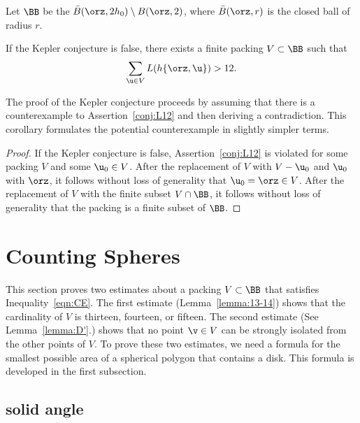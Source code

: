 \begin{definition}[$\BB$] 
Let $\BB$ be the
 $\bar B(\orz,2h_0)\setminus B(\orz,2)$, where
$\bar B(\orz,r)$ is the closed ball of radius $r$.
\end{definition}


\begin{corollary}\label{cor:CE} 
  If the Kepler conjecture is false, there exists a finite packing
  $V\subset\BB$ such that
\begin{equation}\label{eqn:CE} 
\sum_{ \u\in V} L(h\{\orz, \u\}) > 12.
\end{equation}
\end{corollary}

The proof of the Kepler conjecture proceeds by assuming that there is
a counterexample to Assertion~\ref{conj:L12} and then deriving a contradiction.
This corollary formulates the potential counterexample in slightly simpler terms.

\begin{proof} If the Kepler conjecture is false,
Assertion~\ref{conj:L12} is violated for some packing $ V$ and some
$ \u_0\in V$.  After the replacement of $ V$ with $ V - \u_0$ and $
\u_0$ with $\orz$, it follows without loss of generality that $
\u_0=\orz\in V$.  After the replacement of $ V$ with the finite
subset
$V\cap \BB$,
it follows without loss of generality that the packing is a finite subset of $\BB$.
\end{proof}



\section{Counting Spheres}

This section proves two estimates about a packing $V\subset \BB$ that
satisfies Inequality~\ref{eqn:CE}.  The first estimate
(Lemma~\ref{lemma:13-14}) shows that the cardinality of $V$ is thirteen,
fourteen, or fifteen.  The second estimate (See Lemma~\ref{lemma:D'}.)  shows
that no point $\v\in V$ can be strongly isolated from the other points
of $V$.    To prove these two estimates, we need a formula for the smallest
possible area of a spherical polygon that contains a disk.  This formula is
developed in the first subsection.

\subsection{solid angle}
%
%


